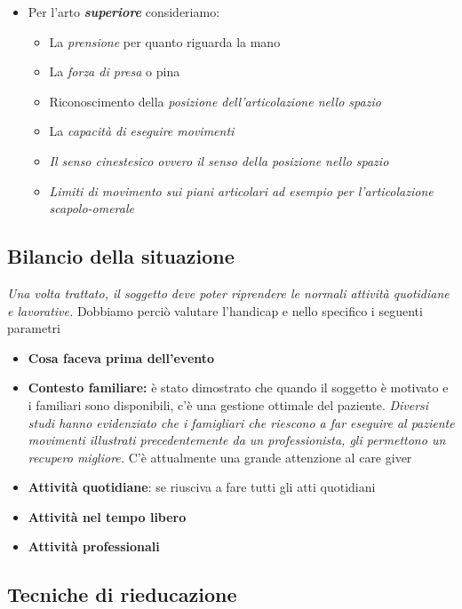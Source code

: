 \begin{itemize}
\item
  Per l'arto \textbf{\emph{superiore}} consideriamo:

\begin{itemize}
\item
  La \emph{prensione} per quanto riguarda la mano
\item
  La \emph{forza di presa} o pina
\item
  Riconoscimento della \emph{posizione dell'articolazione nello spazio}
\item
  La \emph{capacità di eseguire movimenti}
\item
  \emph{Il \emph{senso cinestesico} ovvero il senso della posizione nello spazio}
\item
  \emph{\emph{Limiti di movimento sui piani articolari ad esempio per l'articolazione scapolo-omerale}}
\end{itemize}
\end{itemize}


\subsection{Bilancio della situazione}

\emph{Una volta trattato, il soggetto deve poter riprendere le normali attività quotidiane e lavorative.} Dobbiamo perciò valutare l'handicap e nello specifico i seguenti parametri
\begin{itemize}
\item \textbf{Cosa faceva prima dell'evento}
\item
  \textbf{Contesto familiare:} è stato dimostrato che quando il soggetto è motivato e i familiari sono disponibili, c'è una gestione ottimale del paziente. \emph{Diversi studi hanno evidenziato che i famigliari che riescono a far eseguire al paziente movimenti illustrati precedentemente da un professionista, gli permettono un recupero migliore.} C'è attualmente una grande attenzione al care giver
\item
  \textbf{Attività quotidiane}: se riusciva a fare tutti gli atti quotidiani
\item
  \textbf{Attività nel tempo libero}
\item
  \textbf{Attività professionali}
\end{itemize}


\subsection{Tecniche di rieducazione}

